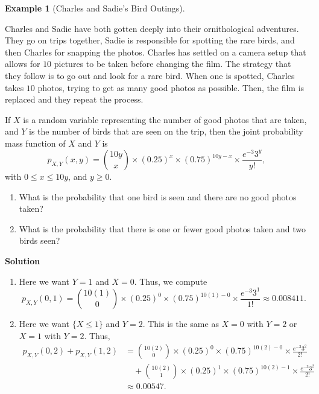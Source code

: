 \documentclass[
  letterpaper,
  DIV=11,
  numbers=noendperiod]{scrreprt}
\providecommand{\tightlist}{%
  \setlength{\itemsep}{0pt}\setlength{\parskip}{0pt}}\usepackage{longtable,booktabs,array}
\theoremstyle{definition}
\theoremstyle{definition}
\newtheorem{example}{Example}[chapter]
\theoremstyle{definition}
\theoremstyle{remark}
\begin{document}
\begin{example}[Charles and Sadie's Bird
Outings]\protect\hypertarget{exm-joint-pmf}{}\label{exm-joint-pmf}

Charles and Sadie have both gotten deeply into their ornithological
adventures. They go on trips together, Sadie is responsible for spotting
the rare birds, and then Charles for snapping the photos. Charles has
settled on a camera setup that allows for \(10\) pictures to be taken
before changing the film. The strategy that they follow is to go out and
look for a rare bird. When one is spotted, Charles takes \(10\) photos,
trying to get as many good photos as possible. Then, the film is
replaced and they repeat the process.

If \(X\) is a random variable representing the number of good photos
that are taken, and \(Y\) is the number of birds that are seen on the
trip, then the joint probability mass function of \(X\) and \(Y\) is
\[p_{X,Y}(x, y) = \binom{10y}{x}\times(0.25)^{x}\times(0.75)^{10y - x}\times\frac{e^{-3}3^y}{y!},\]
with \(0 \leq x \leq 10y\), and \(y \geq 0\).

\begin{enumerate}
\def\labelenumi{\alph{enumi}.}
\tightlist
\item
  What is the probability that one bird is seen and there are no good
  photos taken?
\item
  What is the probability that there is one or fewer good photos taken
  and two birds seen?
\end{enumerate}

\begin{tcolorbox}[enhanced jigsaw, colback=white, colframe=quarto-callout-color-frame, arc=.35mm, leftrule=.75mm, rightrule=.15mm, opacityback=0, breakable, bottomrule=.15mm, left=2mm, toprule=.15mm]

\vspace{-3mm}\textbf{Solution}\vspace{3mm}

\begin{enumerate}
\def\labelenumi{\alph{enumi}.}
\item
  Here we want \(Y = 1\) and \(X = 0\). Thus, we compute
  \[p_{X,Y}(0, 1) = \binom{10(1)}{0}\times(0.25)^{0}\times(0.75)^{10(1) - 0}\times\frac{e^{-3}3^1}{1!} \approx 0.008411.\]
\item
  Here we want \(\{X \leq 1\}\) and \(Y = 2\). This is the same as
  \(X = 0\) with \(Y = 2\) or \(X = 1\) with \(Y = 2\). Thus,
  \begin{align*}
  p_{X,Y}(0,2) + p_{X,Y}(1,2) &= \binom{10(2)}{0}\times(0.25)^{0}\times(0.75)^{10(2) - 0}\times\frac{e^{-3}3^2}{2!} \\
  &\quad + \binom{10(2)}{1}\times(0.25)^{1}\times(0.75)^{10(2) - 1}\times\frac{e^{-3}3^2}{2!} \\
  &\approx 0.00547.\end{align*}
\end{enumerate}

\end{tcolorbox}

\end{example}
\end{document}
